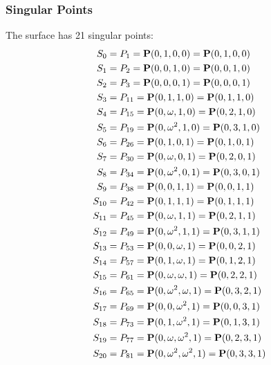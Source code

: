 \documentclass{article}
\newcommand{\bP}{{\bf P}}
\begin{document}
{\subsubsection*{Singular Points}
The surface has 21 singular points:\\
\begin{align*}
S_{0} &= P_{1}=\bP(0, 1, 0, 0) = \bP(0, 1, 0, 0)\\
S_{1} &= P_{2}=\bP(0, 0, 1, 0) = \bP(0, 0, 1, 0)\\
S_{2} &= P_{3}=\bP(0, 0, 0, 1) = \bP(0, 0, 0, 1)\\
S_{3} &= P_{11}=\bP(0, 1, 1, 0) = \bP(0, 1, 1, 0)\\
S_{4} &= P_{15}=\bP(0, \omega , 1, 0) = \bP(0, 2, 1, 0)\\
S_{5} &= P_{19}=\bP(0, \omega^{2}, 1, 0) = \bP(0, 3, 1, 0)\\
S_{6} &= P_{26}=\bP(0, 1, 0, 1) = \bP(0, 1, 0, 1)\\
S_{7} &= P_{30}=\bP(0, \omega , 0, 1) = \bP(0, 2, 0, 1)\\
S_{8} &= P_{34}=\bP(0, \omega^{2}, 0, 1) = \bP(0, 3, 0, 1)\\
S_{9} &= P_{38}=\bP(0, 0, 1, 1) = \bP(0, 0, 1, 1)\\
S_{10} &= P_{42}=\bP(0, 1, 1, 1) = \bP(0, 1, 1, 1)\\
S_{11} &= P_{45}=\bP(0, \omega , 1, 1) = \bP(0, 2, 1, 1)\\
S_{12} &= P_{49}=\bP(0, \omega^{2}, 1, 1) = \bP(0, 3, 1, 1)\\
S_{13} &= P_{53}=\bP(0, 0, \omega , 1) = \bP(0, 0, 2, 1)\\
S_{14} &= P_{57}=\bP(0, 1, \omega , 1) = \bP(0, 1, 2, 1)\\
S_{15} &= P_{61}=\bP(0, \omega , \omega , 1) = \bP(0, 2, 2, 1)\\
S_{16} &= P_{65}=\bP(0, \omega^{2}, \omega , 1) = \bP(0, 3, 2, 1)\\
S_{17} &= P_{69}=\bP(0, 0, \omega^{2}, 1) = \bP(0, 0, 3, 1)\\
S_{18} &= P_{73}=\bP(0, 1, \omega^{2}, 1) = \bP(0, 1, 3, 1)\\
S_{19} &= P_{77}=\bP(0, \omega , \omega^{2}, 1) = \bP(0, 2, 3, 1)\\
S_{20} &= P_{81}=\bP(0, \omega^{2}, \omega^{2}, 1) = \bP(0, 3, 3, 1)\\
\end{align*}
}
\end{document}
